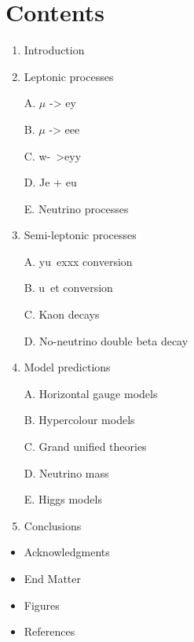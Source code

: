 \documentclass[twoside]{article}
\begin{document}
\section*{Contents}


\begin{enumerate}
\item Introduction

\item  Leptonic processes


A. $\mu$ -> ey

B.  $\mu$ -> eee

C. w-~>eyy

D. Je + eu

E. Neutrino processes

\item  Semi-leptonic processes

A. yu~exxx conversion

B. u~et conversion

C. Kaon decays

D. No-neutrino double beta decay

\item  Model predictions

A. Horizontal gauge models

B. Hypercolour models

C. Grand unified theories

D. Neutrino mass

E. Higgs models

\item Conclusions
\end{enumerate}

\begin{itemize}
\item Acknowledgments


\item End Matter

\item Figures
\item References
\end{itemize}
\end{document}
